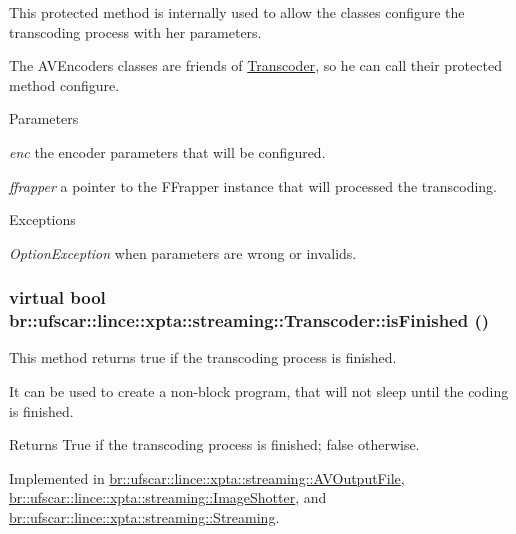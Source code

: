 This protected method is internally used to allow the classes configure the transcoding process with her parameters. 

The AVEncoders classes are friends of \hyperlink{classbr_1_1ufscar_1_1lince_1_1xpta_1_1streaming_1_1Transcoder}{Transcoder}, so he can call their protected method configure. 
\begin{DoxyParams}{Parameters}
\item[{\em enc}]the encoder parameters that will be configured. \item[{\em ffrapper}]a pointer to the FFrapper instance that will processed the transcoding. \end{DoxyParams}

\begin{DoxyExceptions}{Exceptions}
\item[{\em OptionException}]when parameters are wrong or invalids. \end{DoxyExceptions}
\hypertarget{classbr_1_1ufscar_1_1lince_1_1xpta_1_1streaming_1_1Transcoder_aceabe1e9bb931313d5a52a53b9ab4af6}{
\subsubsection[{isFinished}]{\setlength{\rightskip}{0pt plus 5cm}virtual bool br::ufscar::lince::xpta::streaming::Transcoder::isFinished ()}}
\label{classbr_1_1ufscar_1_1lince_1_1xpta_1_1streaming_1_1Transcoder_aceabe1e9bb931313d5a52a53b9ab4af6}


This method returns true if the transcoding process is finished. 

It can be used to create a non-\/block program, that will not sleep until the coding is finished. \begin{DoxyReturn}{Returns}
True if the transcoding process is finished; false otherwise. 
\end{DoxyReturn}


Implemented in \hyperlink{classbr_1_1ufscar_1_1lince_1_1xpta_1_1streaming_1_1AVOutputFile_ad25c8530fc11ca328e5390fb70c4da08}{br::ufscar::lince::xpta::streaming::AVOutputFile}, \hyperlink{classbr_1_1ufscar_1_1lince_1_1xpta_1_1streaming_1_1ImageShotter_a66d326a0a24e08c4b88e3a07ec1f4c5d}{br::ufscar::lince::xpta::streaming::ImageShotter}, and \hyperlink{classbr_1_1ufscar_1_1lince_1_1xpta_1_1streaming_1_1Streaming_a4f3f9a288774205347994431946b5b86}{br::ufscar::lince::xpta::streaming::Streaming}.

